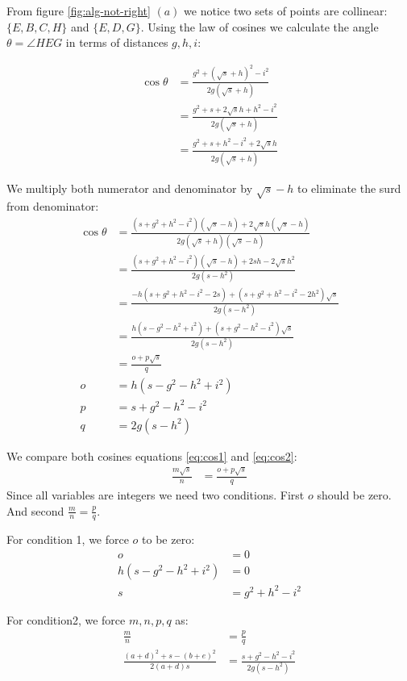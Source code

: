 \documentclass[11pt]{article}
\begin{document}
From figure \ref{fig:alg-not-right} $(a)$ we notice two sets of points are collinear:
$\{ E,B,C,H \}$ and $\{ E,D,G \}$. Using the law of cosines we calculate the 
angle $\theta = \angle{HEG}$ in terms of distances $g,h,i$:

\begin{align}
\cos\theta &= \frac{g^2 + (\sqrt{s}+h)^2 - i^2}{2g(\sqrt{s}+h)} \nonumber\\
 &= \frac{g^2 + s + 2\sqrt{s}h + h^2 - i^2}{2g(\sqrt{s}+h)} \nonumber\\
 &= \frac{g^2 + s + h^2 - i^2+ 2\sqrt{s}h}{2g(\sqrt{s}+h)}
\end{align}

We multiply both numerator and denominator by $\sqrt{s}-h$ to eliminate the surd from denominator:
\begin{align}
\cos\theta &= \frac{(s + g^2 + h^2 - i^2)(\sqrt{s}-h) + 2\sqrt{s}h(\sqrt{s}-h)}
	{2g(\sqrt{s}+h)(\sqrt{s}-h)} \nonumber\\
 &= \frac{(s + g^2 + h^2 - i^2)(\sqrt{s}-h) + 2sh - 2\sqrt{s}h^2}
	{2g(s-h^2)} \nonumber\\ 
 &= \frac{-h(s + g^2 + h^2 - i^2 - 2s) + (s + g^2 + h^2 - i^2 - 2h^2)\sqrt{s}}
	{2g(s-h^2)} \nonumber\\ 
 &= \frac{h(s - g^2 - h^2 + i^2) + (s + g^2 - h^2 - i^2)\sqrt{s}}
	{2g(s-h^2)} \nonumber\\ 
 &= \frac{o + p\sqrt{s}}{q} \label{eq:cos2}\\
o &= h(s - g^2 - h^2 + i^2) \\
p &= s + g^2 - h^2 - i^2 \\
q &= 2g(s-h^2)
\end{align}

We compare both cosines equations \ref{eq:cos1} and \ref{eq:cos2}:
\begin{align}
\frac{m\sqrt{s}}{n} &= \frac{o + p\sqrt{s}}{q}
\end{align}
Since all variables are integers we need two conditions. First $o$ should be zero.
And second $\frac{m}{n} = \frac{p}{q}$.

For condition 1, we force $o$ to be zero:
\begin{align}
o &= 0 \nonumber\\
h(s - g^2 - h^2 + i^2) & = 0 \nonumber\\
s &= g^2 + h^2 - i^2 \label{eq:condition1}
\end{align}

For condition2, we force $m,n,p,q$ as:
\begin{align}
\frac{m}{n} &= \frac{p}{q} \nonumber\\
\frac{(a+d)^2 + s - (b+e)^2}{2(a+d)s} &= \frac{s + g^2 - h^2 - i^2}{2g(s-h^2)} \nonumber\\
\end{align}
\end{document}
